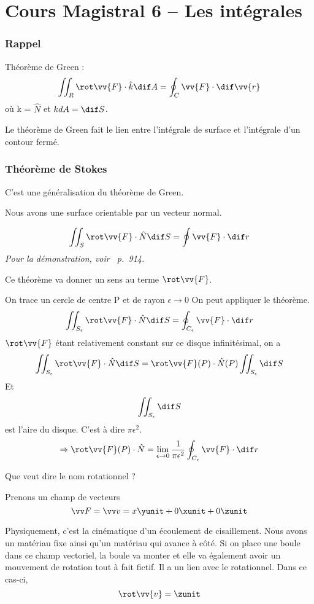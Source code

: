 \part{Cours Magistral 6 -- Les intégrales}
\section{Rappel}

Théorème de Green :
\[ \iint_R \rot \vv{F} \cdot \hat{k} \dif A = \oint_C \vv{F} \cdot \dif \vv{r} \]
où k = $\hat{N}$ et $kdA = \dif S$.

Le théorème de Green fait le lien entre l'intégrale de surface et l'intégrale d'un contour fermé.


\section{Théorème de Stokes}

C'est une généralisation du théorème de Green.

Nous avons une surface orientable par un vecteur normal.

\[\iint_S \rot \vv{F}\cdot \hat{N} \dif S = \oint \vv{F}\cdot \dif r\]
\textit{Pour la démonstration, voir~\cite{adams2013calculus} p.~914.}

Ce théorème va donner un sens au terme $\rot \vv{F}$.

On trace un cercle de centre P et de rayon $\epsilon \to 0$ On peut appliquer le théorème.
\[\iint_{S_{\epsilon}} \rot \vv{F} \cdot \hat{N} \dif S = \oint_{C_{\epsilon}} \vv{F} \cdot \dif r\]
$\rot \vv{F}$ étant relativement constant sur ce disque infinitésimal, on a
\[\iint_{S_{\epsilon}} \rot \vv{F}\cdot \hat{N} \dif S = \rot \vv{F} (P) \cdot \hat{N} (P) \iint_{S_{\epsilon}} \dif S\]
Et \[\iint_{S_{\epsilon}} \dif S\] est l'aire du disque. C'est à dire $\pi \epsilon ^2$.
\[\Rightarrow \rot \vv{F}(P) \cdot \hat{N} = \lim_{\epsilon \to 0 }\frac{1}{\pi \epsilon ^2} \oint_{C_{\epsilon}} \vv{F} \cdot \dif r\]

Que veut dire le nom \og rotationnel\fg{} ?

Prenons un champ de vecteurs
\[\vv F = \vv v = x \yunit +0 \xunit +0 \zunit\]

Physiquement, c'est la cinématique d'un écoulement de cisaillement. Nous avons un matériau fixe ainsi qu'un matériau qui avance à côté.
Si on place une \og boule\fg{} dans ce champ vectoriel, la boule va monter et elle va également avoir un mouvement de rotation tout à fait fictif. Il a un lien avec le rotationnel. Dans ce cas-ci,\[\rot \vv{v} = \zunit\]

